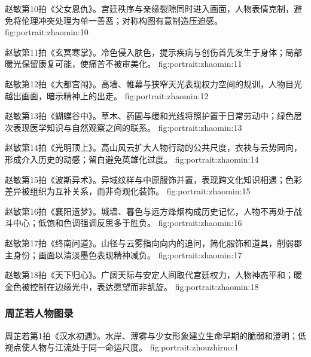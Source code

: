 \clearpage

  {赵敏第10拍《父女恩仇》。宫廷秩序与亲缘裂隙同时进入画面，人物表情克制，避免将伦理冲突处理为单一善恶；对称构图有意制造压迫感。}
  {fig:portrait:zhaomin:10}

  {赵敏第11拍《玄冥寒掌》。冷色侵入肤色，提示疾病与创伤首先发生于身体；局部暖光保留康复可能，使痛苦不被审美化。}
  {fig:portrait:zhaomin:11}

  {赵敏第12拍《大都宫闱》。高墙、帷幕与狭窄天光表现权力空间的规训，人物目光越出画面，暗示精神上的出走。}
  {fig:portrait:zhaomin:12}

\clearpage

  {赵敏第13拍《蝴蝶谷中》。草木、药圃与缓和光线将照护置于日常劳动中；绿色层次表现医学知识与自然观察之间的联系。}
  {fig:portrait:zhaomin:13}

  {赵敏第14拍《光明顶上》。高山风云扩大人物行动的公共尺度，衣袂与云势同向，形成介入历史的动感；留白避免英雄化过度。}
  {fig:portrait:zhaomin:14}

  {赵敏第15拍《波斯异术》。异域纹样与中原服饰并置，表现跨文化知识相遇；色彩差异被组织为互补关系，而非奇观化装饰。}
  {fig:portrait:zhaomin:15}

\clearpage

  {赵敏第16拍《襄阳遗梦》。城墙、暮色与远方烽烟构成历史记忆，人物不再处于战斗中心；低饱和色调强调反思多于胜负。}
  {fig:portrait:zhaomin:16}

  {赵敏第17拍《终南问道》。山径与云雾指向向内的追问，简化服饰和道具，削弱郡主身份；画面以清淡墨色表现精神减负。}
  {fig:portrait:zhaomin:17}

  {赵敏第18拍《天下归心》。广阔天际与安定人间取代宫廷权力，人物神态平和；暖金色被控制在边缘光中，表达愿望而非凯旋。}
  {fig:portrait:zhaomin:18}

\clearpage
\subsubsection{周芷若人物图录}

  {周芷若第1拍《汉水初遇》。水岸、薄雾与少女形象建立生命早期的脆弱和澄明；低视点使人物与江流处于同一命运尺度。}
  {fig:portrait:zhouzhiruo:1}

